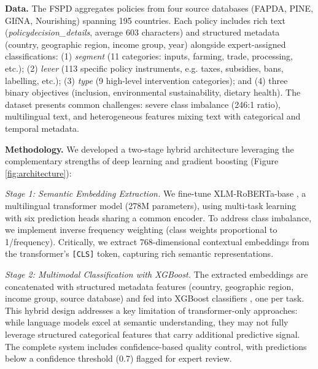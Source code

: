 \documentclass[a4paper,12pt]{article}
\begin{document}
\textbf{Data.} The FSPD aggregates policies from four source databases (FAPDA, PINE, GIfNA, Nourishing) spanning 195 countries. Each policy includes rich text (\textit{policydecision\_details}, average 603 characters) and structured metadata (country, geographic region, income group, year) alongside expert-assigned classifications: (1) \textit{segment} (11 categories: inputs, farming, trade, processing, etc.); (2) \textit{lever} (113 specific policy instruments, e.g. taxes, subsidies, bans, labelling, etc.); (3) \textit{type} (9 high-level intervention categories); and (4) three binary objectives (inclusion, environmental sustainability, dietary health). The dataset presents common challenges: severe class imbalance (246:1 ratio), multilingual text, and heterogeneous features mixing text with categorical and temporal metadata.
\newline

\noindent\textbf{Methodology.} We developed a two-stage hybrid architecture leveraging the complementary strengths of deep learning and gradient boosting (Figure \ref{fig:architecture}):

\textit{Stage 1: Semantic Embedding Extraction.} We fine-tune XLM-RoBERTa-base \cite{conneau2020}, a multilingual transformer model (278M parameters), using multi-task learning with six prediction heads sharing a common encoder. To address class imbalance, we implement inverse frequency weighting (class weights proportional to 1/frequency). Critically, we extract 768-dimensional contextual embeddings from the transformer's \texttt{[CLS]} token, capturing rich semantic representations.

\textit{Stage 2: Multimodal Classification with XGBoost.} The extracted embeddings are concatenated with structured metadata features (country, geographic region, income group, source database) and fed into XGBoost classifiers \cite{chen2016}, one per task. This hybrid design addresses a key limitation of transformer-only approaches: while language models excel at semantic understanding, they may not fully leverage structured categorical features that carry additional predictive signal. The complete system includes confidence-based quality control, with predictions below a confidence threshold (0.7) flagged for expert review.
\end{document}
